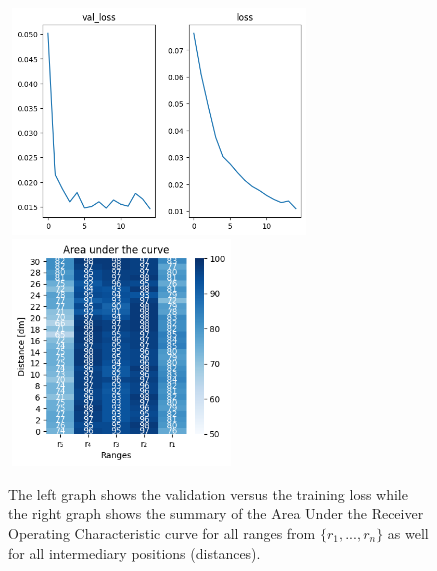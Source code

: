 \begin{multicols}{2}
\end{multicols}\begin{figure}[H]%
\centering
\includegraphics[width=8cm,height=6cm]{3_models/models_9/graph_9.png}
\hspace{0.2 cm}
\includegraphics[width=6cm,height=6cm]{4_plots/plots_9/AUC_9.png}
\caption{The left graph shows the validation versus the training loss while the right graph shows the summary of the Area Under the Receiver Operating Characteristic curve for all ranges from $\{r_{1}, ... ,r_{n}\}$ as well for all intermediary positions (distances).}
\label{auc_9}
\end{figure}


\newpage
